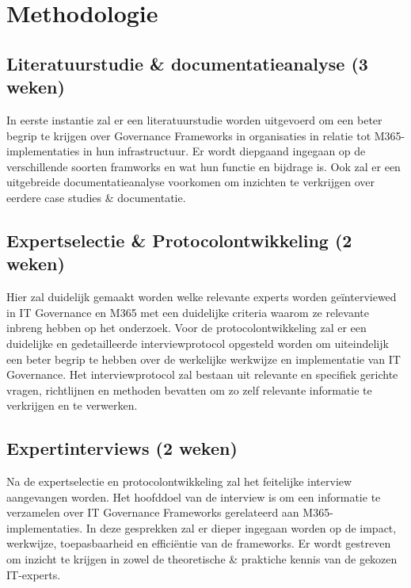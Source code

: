 


\section{Methodologie}%
\label{sec:methodologie}

\subsection{Literatuurstudie \& documentatieanalyse (3 weken)}
In eerste instantie zal er een literatuurstudie worden uitgevoerd om een beter begrip te krijgen over Governance Frameworks in organisaties in relatie tot M365-implementaties in hun infrastructuur. Er wordt diepgaand ingegaan op de verschillende soorten framworks en wat hun functie en bijdrage is. Ook zal er een uitgebreide documentatieanalyse voorkomen om inzichten te verkrijgen over eerdere case studies \& documentatie.

\subsection{Expertselectie \& Protocolontwikkeling (2 weken)}
Hier zal duidelijk gemaakt worden welke relevante experts worden geïnterviewed in IT Governance en M365 met een duidelijke criteria waarom ze relevante inbreng hebben op het onderzoek. Voor de protocolontwikkeling zal er een duidelijke en gedetailleerde interviewprotocol opgesteld worden om uiteindelijk een beter begrip te hebben over de werkelijke werkwijze en implementatie van IT Governance.
Het interviewprotocol zal bestaan uit relevante en specifiek gerichte vragen, richtlijnen en methoden bevatten om zo zelf relevante informatie te verkrijgen en te verwerken.

\subsection{Expertinterviews (2 weken)}
Na de expertselectie en protocolontwikkeling zal het feitelijke interview aangevangen worden. Het hoofddoel van de interview is om een informatie te verzamelen over IT Governance Frameworks gerelateerd aan M365-implementaties. In deze gesprekken zal er dieper ingegaan worden op de impact, werkwijze, toepasbaarheid en efficiëntie van de frameworks.
Er wordt gestreven om inzicht te krijgen in zowel de theoretische \& praktiche kennis van de gekozen IT-experts.

